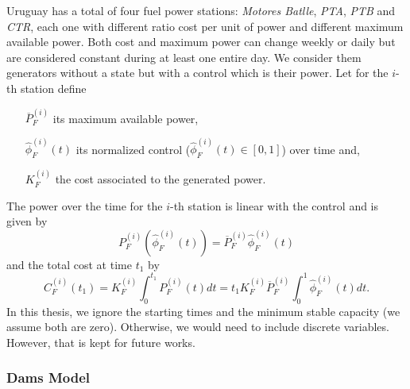 Uruguay has a total of four fuel power stations: \textit{Motores Batlle}, \textit{PTA}, \textit{PTB} and \textit{CTR}, each one with different ratio cost per unit of power and different maximum available power. Both cost and maximum power can change weekly or daily but are considered constant during at least one entire day. We consider them generators without a state but with a control which is their power. Let for the $i$-th station define
\begin{enumerate}

\item[$\overline{P}^{(i)}_F$] its maximum available power,

\item[$\hat{\phi}^{(i)}_F(t)$] its normalized control ($\hat{\phi}^{(i)}_F(t)\in[0,1]$) over time and,

\item[$K_F^{(i)}$] the cost associated to the generated power.

\end{enumerate}
The power over the time for the $i$-th station is linear with the control and is given by
\begin{equation*}
P_F^{(i)}(\hat{\phi}^{(i)}_F(t))=\overline{P}^{(i)}_F\hat{\phi}^{(i)}_F(t)
\end{equation*}
and the total cost at time $t_1$ by
\begin{equation}
C_F^{(i)}(t_1)=K_F^{(i)}\int_0^{t_1}P_F^{(i)}(t)dt=t_1K_F^{(i)}\overline{P}^{(i)}_F\int_0^{1}\hat{\phi}^{(i)}_F(t)dt.
\label{Fuel_Cost_Function}
\end{equation}
In this thesis, we ignore the starting times and the minimum stable capacity (we assume both are zero). Otherwise, we would need to include discrete variables. However, that is kept for future works.

\subsubsection{Dams Model} \label{Subsection_Dams_Model}

